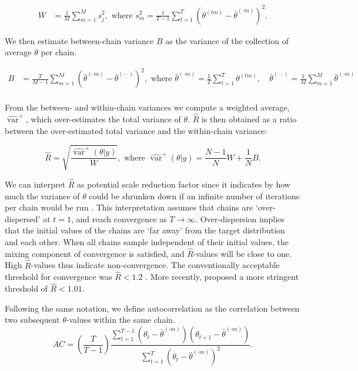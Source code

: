 \documentclass[article]{jss}
\begin{document}
\begin{align*}
W&=\frac{1}{M} \sum_{m=1}^{M} s_{j}^{2},  \text { where } s_{m}^{2}=\frac{1}{T-1} \sum_{t=1}^{T}\left(\theta^{(t m)}-\bar{\theta}^{(\cdot m)}\right)^{2}. %
\end{align*}

We then estimate between-chain variance $B$ as the variance of the collection of average $\theta$ per chain.

\begin{align*}
B&=\frac{T}{M-1} \sum_{m=1}^{M}\left(\bar{\theta}^{(\cdot m)}-\bar{\theta}^{(\cdot \cdot)}\right)^{2}, \text { where } \bar{\theta}^{(\cdot m)}=\frac{1}{T} \sum_{t=1}^{T} \theta^{(t m)}, \quad \bar{\theta}^{(\cdot \cdot)}=\frac{1}{M} \sum_{m=1}^{M} \bar{\theta}^{(\cdot m)} \\
\end{align*}

From the between- and within-chain variances we compute a weighted average, $\widehat{\operatorname{var}}^{+}$, which over-estimates the total variance of $\theta$. $\widehat{R}$ is then obtained as a ratio between the over-estimated total variance and the within-chain variance:

\begin{equation*}
\widehat{R}=\sqrt{\frac{\widehat{\operatorname{var}}^{+}(\theta | y)}{W}},
\text{ where } \widehat{\operatorname{var}}^{+}(\theta | y)=\frac{N-1}{N} W+\frac{1}{N} B.
\end{equation*}

We can interpret $\widehat{R}$ as potential scale reduction factor since it indicates by how much the variance of $\theta$ could be shrunken down if an infinite number of iterations per chain would be run \citep{gelm92}. This interpretation assumes that chains are `over-dispersed' at $t=1$, and reach convergence as $T \to \infty$. Over-dispersion implies that the initial values of the chains are `far away' from the target distribution and each other. When all chains sample independent of their initial values, the mixing component of convergence is satisfied, and $\widehat{R}$-values will be close to one. High $\widehat{R}$-values thus indicate non-convergence. The conventionally acceptable threshold for convergence was $\widehat{R} < 1.2$ \citep{gelm92}. More recently, \cite{veht19} proposed a more stringent threshold of $\widehat{R} < 1.01$. 

Following the same notation, we define autocorrelation as the correlation between two subsequent $\theta$-values within the same chain\footnotemark  \citep[p.~147]{lync07}. %
%
\begin{equation*}
AC = \left( \frac{T}{T-1} \right) \frac{\sum_{t=1}^{T-1}(\theta_t - \bar{\theta}^{(\cdot m)})(\theta_{t+1} - \bar{\theta}^{(\cdot m)})}{\sum_{t=1}^{T}(\theta_t - \bar{\theta}^{(\cdot m)})^2}.
\end{equation*}
%
\end{document}
